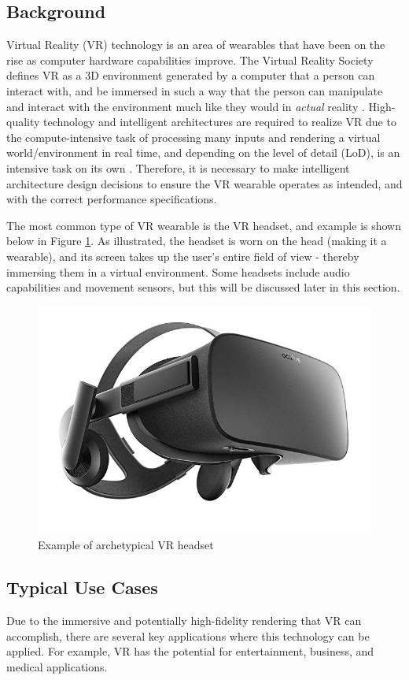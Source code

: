 \subsection{Background}
Virtual Reality (VR) technology is an area of wearables that have been on the rise
as computer hardware capabilities improve. The Virtual Reality Society defines VR as
a 3D environment generated by a computer that a person can interact with, and be
immersed in such a way that the person can manipulate and interact with the environment
much like they would in \textit{actual} reality \cite{vr_soc_defn}. High-quality
technology and intelligent architectures are required to realize VR due to
the compute-intensive task of processing many inputs and rendering a virtual
world/environment in real time, and depending on the level of detail (LoD), is
an intensive task on its own \cite{hickey_wt4_pres}. Therefore, it is necessary
to make intelligent architecture design decisions to ensure the VR wearable operates
as intended, and with the correct performance specifications.

The most common type of VR wearable is the VR headset, and example is shown below in
Figure \ref{vr:example}. As illustrated, the headset is worn on the head (making it
a wearable), and its screen takes up the user's entire field of view - thereby immersing
them in a virtual environment. Some headsets include audio capabilities and movement
sensors, but this will be discussed later in this section.


\begin{figure}[h]
    \centering
    \includegraphics[width=.3\linewidth]{media/vr_headset_example.jpg}
    \caption{Example of archetypical VR headset \cite{vr_headset_pic}}
    \label{vr:example}
\end{figure}

\subsection{Typical Use Cases}
Due to the immersive and potentially high-fidelity rendering that VR can accomplish,
there are several key applications where this technology can be applied. For example, 
VR has the potential for entertainment, business, and medical applications.

